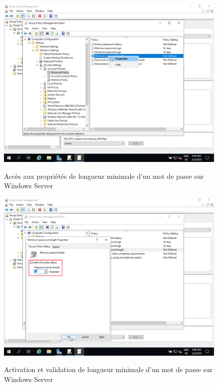 \begin{figure}[h!]
	\begin{center}
		\caption{Accès aux propriétés de longueur minimale d'un mot de passe sur Windows Server}
		\includegraphics[scale=0.5]{WS_Screenshots/gpo_8.png}
		\label{WS_Screenshots/gpo_8}
	\end{center}
\end{figure}
\FloatBarrier 
    

\begin{figure}[h!]
	\begin{center}
		\caption{Activation et validation de longueur minimale d'un mot de passe sur Windows Server}
		\includegraphics[scale=0.5]{WS_Screenshots/gpo_9.png}
		\label{WS_Screenshots/gpo_9}
	\end{center}
\end{figure}
\FloatBarrier 
    


